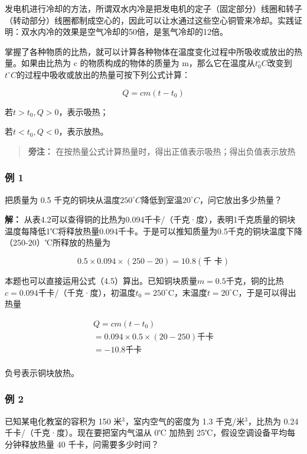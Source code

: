 发电机进行冷却的方法，所谓双水内冷是把发电机的定子（固定部分）线圈和转子（转动部分）线圈都制成空心的，因此可以让水通过这些空心铜管来冷却。实践证明：双水内冷的效果是空气冷却的50倍，是氢气冷却的12倍。

掌握了各种物质的比热，就可以计算各种物体在温度变化过程中所吸收或放出的热量。如果由比热为
c 的物质构成的物体的质量为
m，那么它在温度从\(t_{0}^{\circ}C\)改变到\(t^{\circ}C\)的过程中吸收或放出的热量可按下列公式计算：

\[
Q = c m (t - t _ {0}) \tag {4.5}
\]

若\(t > t_0, Q > 0\)，表示吸热；

若\(t < t_0, Q < 0\)，表示放热。

\begin{quote}
\textbf{旁注：}
在按热量公式计算热量时，得出正值表示吸热；得出负值表示放热
\end{quote}

\subsubsection{例 1}\label{ux4f8b-1-3}

把质量为 0.5
千克的铜块从温度\(250^{\circ}C\)降低到室温\(20^{\circ}C\)，问它放出多少热量？

\textbf{解：}
从表4.2可以查得铜的比热为0.094千卡/（千克·度），表明1千克质量的铜块温度每降低1℃将释放热量0.094千卡。于是可以推知质量为0.5千克的铜块温度下降（250-20）℃所释放的热量为

\[
0.5 \times 0.094 \times (250 - 20) = 10.8 (\text{千   卡})
\]

本题也可以直接运用公式（4.5）算出。已知铜块质量\(m = 0.5\)千克，铜的比热\(c = 0.094\)千卡/（千克·度），初温度\(t_0 = 250^\circ \mathrm{C}\)，末温度\(t = 20^\circ \mathrm{C}\)，于是可以得出热量

\[
\begin{array}{l} Q = c m (t - t _ {0}) \\ = 0.094 \times 0.5 \times (20 - 250) \text{千卡} \\ = - 10.8 \text{千卡} \\ \end{array}
\]

负号表示铜块放热。

\subsubsection{例 2}\label{ux4f8b-2-3}

已知某电化教室的容积为 150 米\(^{3}\)，室内空气的密度为 1.3
千克/米\(^{3}\)，比热为 0.24 千卡/（千克·度）。现在要把室内气温从 0℃
加热到 25℃，假设空调设备平均每分钟释放热量 40 千卡，问需要多少时间？

